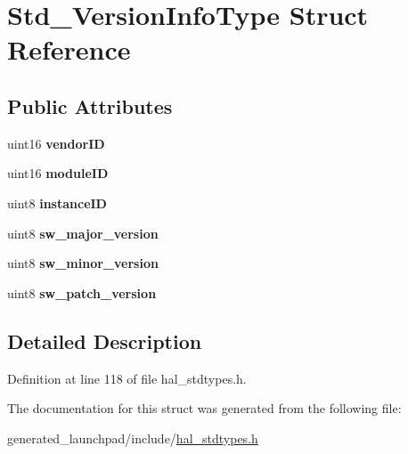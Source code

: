\hypertarget{structStd__VersionInfoType}{}\section{Std\+\_\+\+Version\+Info\+Type Struct Reference}
\label{structStd__VersionInfoType}
\subsection*{Public Attributes}
\begin{DoxyCompactItemize}
\item 
\mbox{\label{structStd__VersionInfoType_a26055f45e3016862f87063d1feccea8d}} 
uint16 {\bfseries vendor\+ID}
\item 
\mbox{\label{structStd__VersionInfoType_a39e3d6d4bbac41bdba1e51e8876522d2}} 
uint16 {\bfseries module\+ID}
\item 
\mbox{\label{structStd__VersionInfoType_af79925c1afbf00665aefcb18c90db619}} 
uint8 {\bfseries instance\+ID}
\item 
\mbox{\label{structStd__VersionInfoType_ad08a3e87fe83d635d0d28fd6e99271af}} 
uint8 {\bfseries sw\+\_\+major\+\_\+version}
\item 
\mbox{\label{structStd__VersionInfoType_ab27f4e07c28199c14e79d44a3ea09008}} 
uint8 {\bfseries sw\+\_\+minor\+\_\+version}
\item 
\mbox{\label{structStd__VersionInfoType_af9854c941ce22e88a1718fd2aa183c3c}} 
uint8 {\bfseries sw\+\_\+patch\+\_\+version}
\end{DoxyCompactItemize}


\subsection{Detailed Description}


Definition at line 118 of file hal\+\_\+stdtypes.\+h.



The documentation for this struct was generated from the following file\+:\begin{DoxyCompactItemize}
\item 
generated\+\_\+launchpad/include/\mbox{\hyperlink{hal__stdtypes_8h}{hal\+\_\+stdtypes.\+h}}\end{DoxyCompactItemize}
